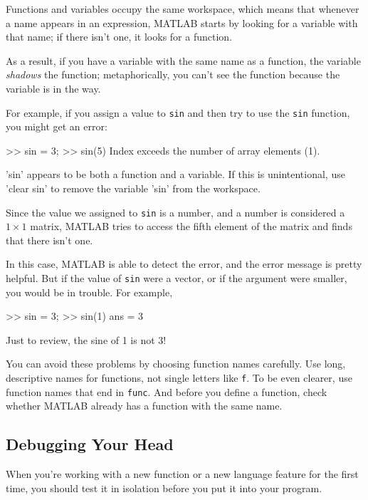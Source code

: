 Functions and variables occupy the same workspace, which means
that whenever a name appears in an expression, MATLAB starts by looking
for a variable with that name; if there isn't one, it looks for
a function.


As a result, if you have a variable with the same name as a function,
the variable \emph{shadows} the function; metaphorically, you can't see the function because the variable is in the way.

For example, if you assign
a value to \lstinline{sin} and then try to use the \lstinline{sin} function, you
might get an error:

\begin{code}
>> sin = 3;
>> sin(5)
Index exceeds the number of array elements (1).

'sin' appears to be both a function and a variable.
If this is unintentional, use 'clear sin' to remove
the variable 'sin' from the workspace.
\end{code}

Since the value we assigned to \lstinline{sin} is a number, and a number is considered a $1 \times 1$ matrix, MATLAB tries to access the fifth element of the matrix and finds that there isn't one.

In this case, MATLAB is able to detect the error, and the error message is pretty helpful.
But if the value of \lstinline{sin} were a vector, or if the argument were smaller, you would be in trouble.  For example,

\begin{code}
>> sin = 3;
>> sin(1)
ans = 3
\end{code}

Just to review, the sine of 1 is not 3!

You can avoid these problems by choosing function names carefully. Use long, descriptive names for functions, not single letters like \lstinline{f}. To be even clearer, use function names that end in \lstinline{func}. And before you define a function, check whether MATLAB already has a function with the same name.

\subsection{Debugging Your Head}

When you're working with a new function or a new language feature
for the first time, you should test it in isolation before you
put it into your program.

